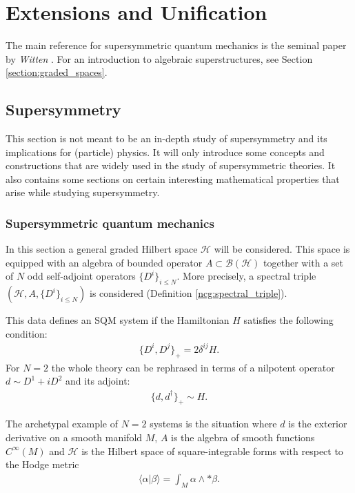 \chapter{Extensions and Unification}\label{chapter:unification}

    The main reference for supersymmetric quantum mechanics is the seminal paper by \textit{Witten} \cite{witten_morse}. For an introduction to algebraic superstructures, see Section \ref{section:graded_spaces}.

\section{Supersymmetry}

    This section is not meant to be an in-depth study of supersymmetry and its implications for (particle) physics. It will only introduce some concepts and constructions that are widely used in the study of supersymmetric theories. It also contains some sections on certain interesting mathematical properties that arise while studying supersymmetry.

\subsection{Supersymmetric quantum mechanics}

    In this section a general graded Hilbert space $\mathcal{H}$ will be considered. This space is equipped with an algebra of bounded operator $A\subset\mathcal{B}(\mathcal{H})$ together with a set of $N$ odd self-adjoint operators $\{D^i\}_{i\leq N}$. More precisely, a spectral triple $(\mathcal{H},A,\{D^i\}_{i\leq N})$ is considered (Definition \ref{ncg:spectral_triple}).

    This data defines an SQM system if the Hamiltonian $H$ satisfies the following condition:
    \begin{gather}
        \{D^i,D^j\}_+ = 2\delta^{ij}H.
    \end{gather}
    For $N=2$ the whole theory can be rephrased in terms of a nilpotent operator $d\sim D^1+iD^2$ and its adjoint:
    \begin{gather}
        \{d,d^\dagger\}_+\sim H.
    \end{gather}

    \begin{example}
        The archetypal example of $N=2$ systems is the situation where $d$ is the exterior derivative on a smooth manifold $M$, $A$ is the algebra of smooth functions $C^\infty(M)$ and $\mathcal{H}$ is the Hilbert space of square-integrable forms with respect to the Hodge metric
        \begin{gather}
            \langle\alpha|\beta\rangle = \int_M\alpha\wedge\ast\beta.
        \end{gather}
    \end{example}

